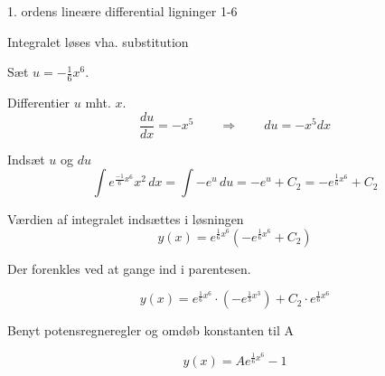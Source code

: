 \documentclass{article}
\begin{document}
\begin{exercise}{1. ordens lineære differential ligninger 1-6}
	\hint
	
	Integralet løses vha. substitution
	
	
	\hint
	Sæt $u = -\frac{1}{6}x^6$.
	
	\hint
	
	Differentier $u$ mht. $x$.
	\[
	\frac{du}{dx} = -x^5 \qquad	\Rightarrow \qquad du = -x^5 dx
	\]
	
	\hint 
	Indsæt $u$ og $du$
	\[
	\int e^{\frac{-1}{6}x^6}x^2 \, dx = \int -e^{u} \, du = -e^{u} + C_2 = -e^{\frac{1}{6}x^6} + C_2
	\]
	
	\hint
	
	Værdien af integralet indsættes i løsningen
	\[
	y(x) = e^{\frac{1}{6}x^6} \left( -e^{\frac{1}{6}x^6} + C_2\right)
	\]
	
	\hint
	
	Der forenkles ved at gange ind i parentesen.
	
	\hint
	\[
	y(x) = e^{\frac{1}{6}x^6} \cdot \left(-e^{\frac{1}{3}x^3} \right) + C_2 \cdot e^{\frac{1}{6}x^6} 
	\]
	
	\hint
	
	Benyt potensregneregler og omdøb konstanten til A
	
	\hint
	\[
	y(x) = A e^{\frac{1}{6}x^6} - 1
	\]
	
	
\end{exercise}

\newpage
\end{document}
